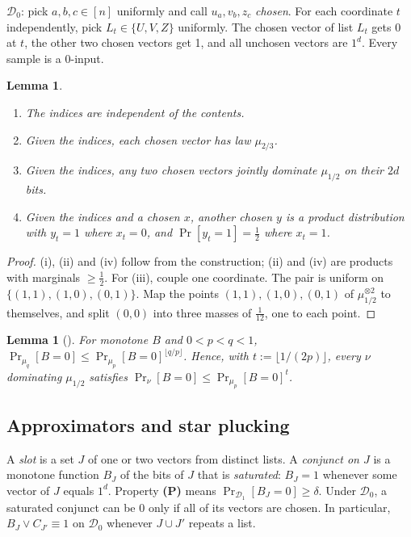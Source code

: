 \documentclass[11pt,a4paper]{article}
\theoremstyle{plain}
\newtheorem{lemma}[theorem]{Lemma}
\theoremstyle{definition}
\theoremstyle{remark}
\newcommand{\Dz}{\mathcal{D}_0}
\newcommand{\Do}{\mathcal{D}_1}
\newcommand{\ones}{1^d}
\begin{document}
$\Dz$: pick $a,b,c\in[n]$ uniformly and call $u_a,v_b,z_c$ \emph{chosen}. For each coordinate $t$ independently, pick
$L_t\in\{U,V,Z\}$ uniformly. The chosen vector of list $L_t$ gets 0 at $t$, the other two chosen vectors get 1, and
all unchosen vectors are $\ones$. Every sample is a 0-input.

\begin{lemma}\label{lem:d0}
\begin{enumerate}[label=(\roman*)]
  \item The indices are independent of the contents.
  \item Given the indices, each chosen vector has law $\mu_{2/3}$.
  \item Given the indices, any two chosen vectors jointly dominate $\mu_{1/2}$ on their $2d$ bits.
  \item Given the indices and a chosen $x$, another chosen $y$ is a product distribution with $y_t=1$ where $x_t=0$,
    and $\Pr[y_t=1]=\frac12$ where $x_t=1$.
\end{enumerate}
\end{lemma}
\begin{proof}
(i), (ii) and (iv) follow from the construction; (ii) and (iv) are products with marginals $\ge\frac12$. For (iii),
couple one coordinate. The pair is uniform on $\{(1,1),(1,0),(0,1)\}$. Map the points $(1,1),(1,0),(0,1)$ of
$\mu_{1/2}^{\otimes2}$ to themselves, and split $(0,0)$ into three masses of $\frac1{12}$, one to each point.
\end{proof}

\begin{lemma}[{\cite[Lemma 22]{CLSS26}}]\label{lem:clss}
For monotone $B$ and $0<p<q<1$, $\Pr_{\mu_q}[B=0]\le\Pr_{\mu_p}[B=0]^{\lfloor q/p\rfloor}$. Hence, with
$t:=\lfloor1/(2p)\rfloor$, every $\nu$ dominating $\mu_{1/2}$ satisfies $\Pr_\nu[B=0]\le\Pr_{\mu_p}[B=0]^t$.
\end{lemma}

\subsection{Approximators and star plucking}
A \emph{slot} is a set $J$ of one or two vectors from distinct lists. A \emph{conjunct on $J$} is a monotone function
$B_J$ of the bits of $J$ that is \emph{saturated}: $B_J=1$ whenever some vector of $J$ equals $\ones$. Property
\textbf{(P)} means $\Pr_{\Do}[B_J=0]\ge\delta$. Under $\Dz$, a saturated conjunct can be 0 only if all of its vectors
are chosen. In particular, $B_J\vee C_{J'}\equiv1$ on $\Dz$ whenever $J\cup J'$ repeats a list.
\end{document}
